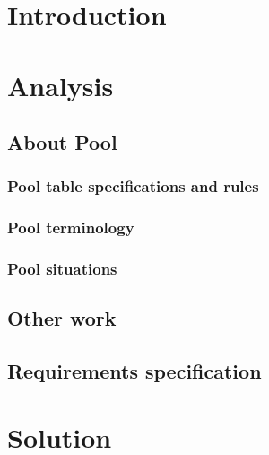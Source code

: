 
\usepackage{float}
\usepackage{graphicx}







\tableofcontents

\chapter{Introduction}

\chapter{Analysis}
	
	\label{sec:analysis}
	
	\section{About Pool}

		\subsection{Pool table specifications and rules}
			\label{sec:rules}
			
	
		\subsection{Pool terminology}
			\label{sec:terminology}
			
	
		\subsection{Pool situations}
			\label{sec:situations}
			
		
	\section{Other work}
		\label{sec:otherwork}
		
					
	\section{Requirements specification}
		\label{sec:reqspec}
		

\chapter{Solution}
	\label{solution}
	

